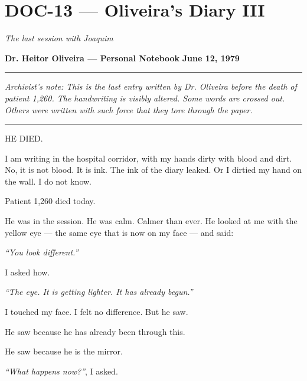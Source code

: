 \section*{\textbf{DOC-13} --- Oliveira's Diary III}

\noindent \textit{The last session with Joaquim}

\noindent \textbf{Dr. Heitor Oliveira --- Personal Notebook}
\textbf{June 12, 1979}

\vspace{0.5em}\noindent\rule{\textwidth}{0.5pt}\vspace{0.5em}

\noindent \textit{Archivist's note: This is the last entry written by Dr. Oliveira before the death of patient 1,260. The handwriting is visibly altered. Some words are crossed out. Others were written with such force that they tore through the paper.}

\vspace{0.5em}\noindent\rule{\textwidth}{0.5pt}\vspace{0.5em}

\noindent HE DIED.

\noindent I am writing in the hospital corridor, with my hands dirty with blood and dirt. No, it is not blood. It is ink. The ink of the diary leaked. Or I dirtied my hand on the wall. I do not know.

\noindent Patient 1,260 died today.

\noindent He was in the session. He was calm. Calmer than ever. He looked at me with the yellow eye --- the same eye that is now on my face --- and said:

\noindent \textit{\textquotedblleft{}You look different.\textquotedblright{}}

\noindent I asked how.

\noindent \textit{\textquotedblleft{}The eye. It is getting lighter. It has already begun.\textquotedblright{}}

\noindent I touched my face. I felt no difference. But he saw.

\noindent He saw because he has already been through this.

\noindent He saw because he is the mirror.

\noindent \textit{\textquotedblleft{}What happens now?\textquotedblright{}}, I asked.

